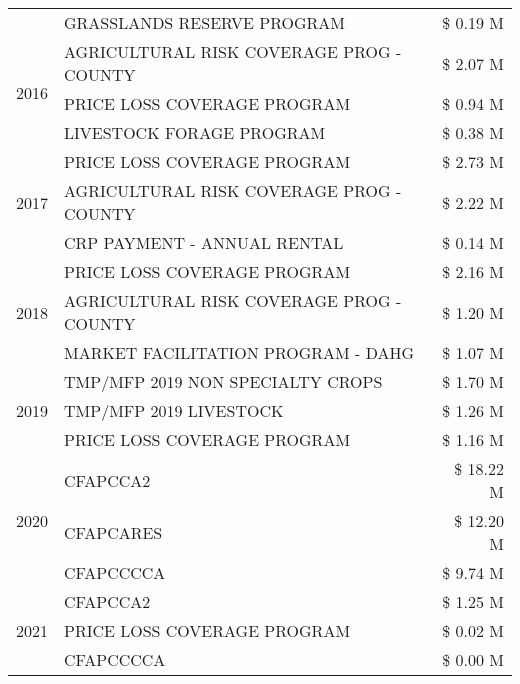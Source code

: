 \begin{tabular}{llr}
 & GRASSLANDS RESERVE PROGRAM & \$ 0.19 M \\
\cline{1-3}
\multirow[t]{3}{*}{2016} & AGRICULTURAL RISK COVERAGE PROG - COUNTY      & \$ 2.07 M \\
 & PRICE LOSS COVERAGE PROGRAM                   & \$ 0.94 M \\
 & LIVESTOCK FORAGE PROGRAM                      & \$ 0.38 M \\
\cline{1-3}
\multirow[t]{3}{*}{2017} & PRICE LOSS COVERAGE PROGRAM & \$ 2.73 M \\
 & AGRICULTURAL RISK COVERAGE PROG - COUNTY & \$ 2.22 M \\
 & CRP PAYMENT - ANNUAL RENTAL & \$ 0.14 M \\
\cline{1-3}
\multirow[t]{3}{*}{2018} & PRICE LOSS COVERAGE PROGRAM & \$ 2.16 M \\
 & AGRICULTURAL RISK COVERAGE PROG - COUNTY & \$ 1.20 M \\
 & MARKET FACILITATION PROGRAM - DAHG & \$ 1.07 M \\
\cline{1-3}
\multirow[t]{3}{*}{2019} & TMP/MFP 2019 NON SPECIALTY CROPS & \$ 1.70 M \\
 & TMP/MFP 2019 LIVESTOCK & \$ 1.26 M \\
 & PRICE LOSS COVERAGE PROGRAM & \$ 1.16 M \\
\cline{1-3}
\multirow[t]{3}{*}{2020} & CFAPCCA2 & \$ 18.22 M \\
 & CFAPCARES & \$ 12.20 M \\
 & CFAPCCCCA & \$ 9.74 M \\
\cline{1-3}
\multirow[t]{3}{*}{2021} & CFAPCCA2 & \$ 1.25 M \\
 & PRICE LOSS COVERAGE PROGRAM & \$ 0.02 M \\
 & CFAPCCCCA & \$ 0.00 M \\
\cline{1-3}
\bottomrule
\end{tabular}

